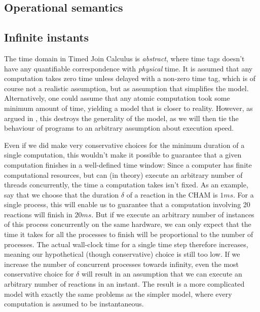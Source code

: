 \subsection{Operational semantics}



\subsection{Infinite instants}

The time domain in Timed Join Calculus is \emph{abstract}, where time tags
doesn't have any quantifiable correspondence with \emph{physical} time. It is
assumed that any computation takes zero time unless delayed with a non-zero
time tag, which is of course not a realistic assumption, but as assumption that
simplifies the model. Alternatively, one could assume that any atomic
computation took some minimum amount of time, yielding a model that is closer
to reality.  However, as argued in \cite{nicollin-overview}, this destroys the
generality of the model, as we will then tie the behaviour of programs to an
arbitrary assumption about execution speed.

Even if we did make very conservative choices for the minimum duration of a
single computation, this wouldn't make it possible to guarantee that a given
computation finishes in a well-defined time window: Since a computer has finite
computational resources, but can (in theory) execute an arbitrary number of
threads concurrently, the time a computation takes isn't fixed. As an example,
say that we choose that the duration $\delta$ of a reaction in the CHAM is $1
ms$. For a single process, this will enable us to guarantee that a computation
involving 20 reactions will finish in $20 ms$. But if we execute an arbitrary
number of instances of this process concurrently on the same hardware, we can
only expect that the time it takes for all the processes to finish will be
proportional to the number of processes. The actual wall-clock time for a
single time step therefore increases, meaning our hypothetical (though
conservative) choice is still too low. If we increase the number of concurrent
processes towards infinity, even the most conservative choice for $\delta$
will result in an assumption that we can execute an arbitrary number of
reactions in an instant. The result is a more complicated model with exactly
the same problems as the simpler model, where every computation is assumed to
be instantaneous.

